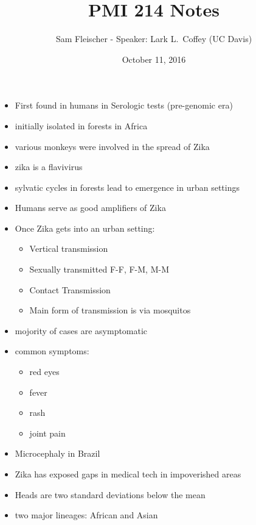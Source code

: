 \documentclass{article}
\title{PMI 214 Notes}
\author{Sam Fleischer - Speaker: Lark L.~Coffey (UC Davis)}
\date{October 11, 2016}
\begin{document}
    \maketitle

    \begin{itemize}
        \item First found in humans in Serologic tests (pre-genomic era)
        \item initially isolated in forests in Africa
        \item various monkeys were involved in the spread of Zika
        \item zika is a flavivirus
        \item sylvatic cycles in forests lead to emergence in urban settings
        \item Humans serve as good amplifiers of Zika
        \item Once Zika gets into an urban setting:
        \begin{itemize}
            \item Vertical transmission
            \item Sexually transmitted F-F, F-M, M-M
            \item Contact Transmission
            \item Main form of transmission is via mosquitos
        \end{itemize}
        \item mojority of cases are asymptomatic
        \item common symptoms:
        \begin{itemize}
            \item red eyes
            \item fever
            \item rash
            \item joint pain
        \end{itemize}
        \item Microcephaly in Brazil
        \item Zika has exposed gaps in medical tech in impoverished areas
        \item Heads are two standard deviations below the mean
        \item two major lineages: African and Asian
        
    \end{itemize}
\end{document}
